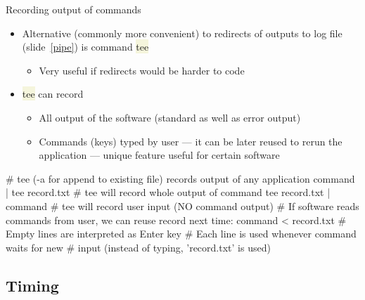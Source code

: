\documentclass[compress, ucs, xelatex, 11pt, xcolor=svgnames, aspectratio=169,
	hyperref={
		bookmarks=true,
		unicode=true,
		colorlinks=true,
		pdftitle={Linux, command line and MetaCentrum},
		plainpages=false,
		pdfauthor={Vojtech Zeisek},
		pdfsubject={Course about use of Linux command line, writing shell scripts and using MetaCentrum of CESNET},
		pdfcreator={XeLaTeX},
		pdfkeywords={Linux, GNU, BASH, shell, command line, MetaCentrum},
		linkcolor=DarkRed, %
		anchorcolor=DarkBlue, %
		citecolor=Indigo, %
		filecolor=NavyBlue, %
		menucolor=DarkMagenta, %
		urlcolor=DarkBlue, %
		pdftex},
	url={hyphens, lowtilde} %
	]{beamer}
\renewcommand{\texttt}[1]{\colorbox{Beige}{{\ttfamily #1}}}
\begin{document}
\begin{frame}[fragile]{Recording output of commands}
	\begin{itemize}
		\item Alternative (commonly more convenient) to redirects of outputs to log file (slide~\ref{pipe}) is command \texttt{tee}
		\begin{itemize}
			\item Very useful if redirects would be harder to code
		\end{itemize}
		\item \texttt{tee} can record
		\begin{itemize}
			\item All output of the software (standard as well as error output)
			\item Commands (keys) typed by user --- it can be later reused to rerun the application --- unique feature useful for certain software
		\end{itemize}
	\end{itemize}
	\vfill
	\begin{bashcode}
    # tee (-a for append to existing file) records output of any application
    command | tee record.txt # tee will record whole output of command
    tee record.txt | command # tee will record user input (NO command output)
    # If software reads commands from user, we can reuse record next time:
    command < record.txt # Empty lines are interpreted as Enter key
                         # Each line is used whenever command waits for new
                         # input (instead of typing, 'record.txt' is used)
	\end{bashcode}
\end{frame}

\subsection{Timing}
\end{document}
